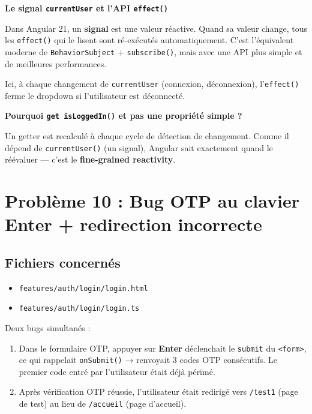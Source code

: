 \documentclass[a4paper,12pt,french]{article}
\begin{document}
\begin{lessonbox}
\textbf{Le signal \texttt{currentUser} et l'API \texttt{effect()}}

Dans Angular 21, un \textbf{signal} est une valeur réactive. Quand sa valeur change, tous les \texttt{effect()} qui le lisent sont ré-exécutés automatiquement. C'est l'équivalent moderne de \texttt{BehaviorSubject} + \texttt{subscribe()}, mais avec une API plus simple et de meilleures performances.

Ici, à chaque changement de \texttt{currentUser} (connexion, déconnexion), l'\texttt{effect()} ferme le dropdown si l'utilisateur est déconnecté.

\textbf{Pourquoi \texttt{get isLoggedIn()} et pas une propriété simple ?}

Un getter est recalculé à chaque cycle de détection de changement. Comme il dépend de \texttt{currentUser()} (un signal), Angular sait exactement quand le réévaluer — c'est le \textbf{fine-grained reactivity}.
\end{lessonbox}

\newpage

\section{Problème 10 : Bug OTP au clavier Enter + redirection incorrecte}

\subsection{Fichiers concernés}
\begin{itemize}
    \item \texttt{features/auth/login/login.html}
    \item \texttt{features/auth/login/login.ts}
\end{itemize}

\begin{problembox}
Deux bugs simultanés :
\begin{enumerate}
    \item Dans le formulaire OTP, appuyer sur \textbf{Enter} déclenchait le \texttt{submit} du \texttt{<form>}, ce qui rappelait \texttt{onSubmit()} → renvoyait 3 codes OTP consécutifs. Le premier code entré par l'utilisateur était déjà périmé.
    \item Après vérification OTP réussie, l'utilisateur était redirigé vers \texttt{/test1} (page de test) au lieu de \texttt{/accueil} (page d'accueil).
\end{enumerate}
\end{problembox}
\end{document}
